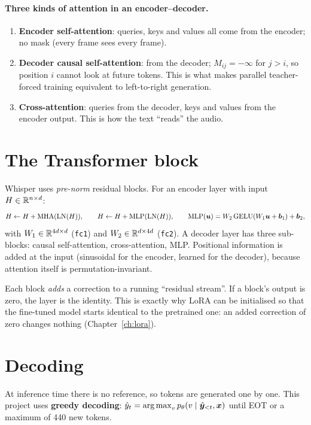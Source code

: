 \paragraph{Three kinds of attention in an encoder--decoder.}
\begin{enumerate}
\item \textbf{Encoder self-attention}: queries, keys and values all come from the encoder; no mask (every frame sees every frame).
\item \textbf{Decoder causal self-attention}: from the decoder; $M_{ij}=-\infty$ for $j>i$, so position $i$ cannot look at
future tokens. This is what makes parallel teacher-forced training equivalent to left-to-right generation.
\item \textbf{Cross-attention}: queries from the decoder, keys and values from the encoder output. This is how the text ``reads''
the audio.
\end{enumerate}

\section{The Transformer block}

Whisper uses \emph{pre-norm} residual blocks. For an encoder layer with input $H\in\mathbb{R}^{n\times d}$:
\[
H\leftarrow H+\mathrm{MHA}(\operatorname{LN}(H)),\qquad H\leftarrow H+\mathrm{MLP}(\operatorname{LN}(H)),\qquad
\mathrm{MLP}(\bm u)=W_2\,\mathrm{GELU}(W_1\bm u+\bm b_1)+\bm b_2,
\]
with $W_1\in\mathbb{R}^{4d\times d}$ (\texttt{fc1}) and $W_2\in\mathbb{R}^{d\times 4d}$ (\texttt{fc2}). A decoder layer has three sub-blocks:
causal self-attention, cross-attention, MLP. Positional information is added at the input (sinusoidal for the encoder, learned for
the decoder), because attention itself is permutation-invariant.

\begin{intuition}
Each block \emph{adds} a correction to a running ``residual stream''. If a block's output is zero, the layer is the identity. This is
exactly why LoRA can be initialised so that the fine-tuned model starts identical to the pretrained one: an added correction of zero
changes nothing (Chapter~\ref{ch:lora}).
\end{intuition}

\section{Decoding}

At inference time there is no reference, so tokens are generated one by one. This project uses \textbf{greedy decoding}:
$\hat y_t=\operatorname*{arg\,max}_v p_\theta(v\mid\hat{\bm{y}}_{<t},\bm{x})$ until EOT or a maximum of 440 new tokens.


